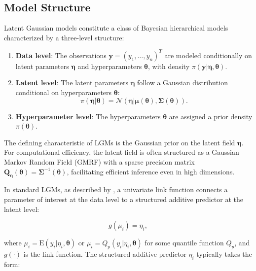
\subsection{Model Structure} \label{subsubsec:model-structure}
Latent Gaussian models constitute a class of Bayesian hierarchical models characterized by a three-level structure:

\begin{enumerate}
    \item \textbf{Data level}: The observations $\mathbf{y} = (y_1, \ldots, y_n)^T$ are modeled conditionally on latent parameters $\boldsymbol{\eta}$ and hyperparameters $\boldsymbol{\theta}$, with density $\pi(\mathbf{y}|\boldsymbol{\eta}, \boldsymbol{\theta})$.

    \item \textbf{Latent level}: The latent parameters $\boldsymbol{\eta}$ follow a Gaussian distribution conditional on hyperparameters $\boldsymbol{\theta}$:
    \begin{equation}
        \pi(\boldsymbol{\eta}|\boldsymbol{\theta}) = \mathcal{N}(\boldsymbol{\eta}|\boldsymbol{\mu}(\boldsymbol{\theta}), \mathbf{\Sigma}(\boldsymbol{\theta})).
    \end{equation}

    \item \textbf{Hyperparameter level}: The hyperparameters $\boldsymbol{\theta}$ are assigned a prior density $\pi(\boldsymbol{\theta})$.
\end{enumerate}

The defining characteristic of LGMs is the Gaussian prior on the latent field $\boldsymbol{\eta}$. For computational efficiency, the latent field is often structured as a Gaussian Markov Random Field (GMRF) with a sparse precision matrix $\mathbf{Q}_{\boldsymbol{\eta}}(\boldsymbol{\theta}) = \mathbf{\Sigma}^{-1}(\boldsymbol{\theta})$, facilitating efficient inference even in high dimensions.

In standard LGMs, as described by \cite{rue2009approximate}, a univariate link function connects a parameter of interest at the data level to a structured additive predictor at the latent level:

\begin{equation}
    g(\mu_i) = \eta_i,
\end{equation}

where $\mu_i = \mathrm{E}(y_i|\eta_i, \boldsymbol{\theta})$ or $\mu_i = Q_p(y_i|\eta_i, \boldsymbol{\theta})$ for some quantile function $Q_p$, and $g(\cdot)$ is the link function. The structured additive predictor $\eta_i$ typically takes the form:

